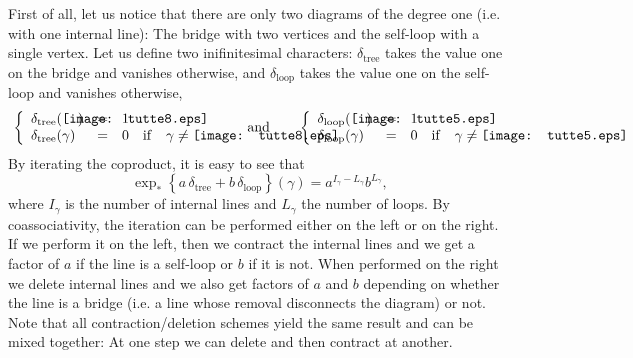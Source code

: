 \documentclass[10pt,here,feynmf]{article}
\begin{document}
First of all, let us notice that there are only two diagrams of the degree one (i.e. with one internal line): The bridge  with two vertices and the self-loop with a single vertex. Let us define two inifinitesimal characters: $\delta_{\mathrm{tree}}$ takes the value one on the bridge and vanishes otherwise, and $\delta_{\mathrm{loop}}$ takes the value one on the self-loop and vanishes otherwise,
\begin{equation}
\left\{
\begin{array}{lclcc}
\delta_{\mathrm{tree}}(\parbox{0.4cm}{\mbox{\texttt{[image: tutte8.eps]}}})&=&1&&\cr
\delta_{\mathrm{tree}}(\gamma)&=&0&\mathrm{if}&\gamma\neq\parbox{0.4cm}{\mbox{\texttt{[image: tutte8.eps]}}}
\end{array}
\right.
\qquad\mathrm{and}\qquad
\left\{
\begin{array}{lclcc}
\delta_{\mathrm{loop}}(\parbox{0.4cm}{\mbox{\texttt{[image: tutte5.eps]}}})&=&1&&\cr
\delta_{\mathrm{loop}}(\gamma)&=&0&\mathrm{if}&\gamma\neq\parbox{0.4cm}{\mbox{\texttt{[image: tutte5.eps]}}}
\end{array}
\right.
\end{equation}
By iterating the coproduct, it is easy to see that
\begin{equation}
\exp_{\ast}\left\{a\,\delta_{\mathrm{tree}}+b\,\delta_{\mathrm{loop}}\right\}(\gamma)=a^{I_{\gamma}\!-\!L_{\gamma}}b^{L_{\gamma}},
\label{diagexpo}
\end{equation}
where $I_{\gamma}$ is the number of internal lines and $L_{\gamma}$ the number of loops. By coassociativity, the iteration can be performed either on the left or on the right. If we perform it on the left, then we contract the internal lines and we get a factor of $a$ if the line is a self-loop or $b$ if it is not. When performed  on the right we delete internal lines and we also get factors of $a$ and $b$ depending on whether the line is a bridge (i.e. a line whose removal disconnects the diagram) or not. Note that all contraction/deletion schemes yield the same result and can be mixed together: At one step we can delete and then contract at another. 
\end{document}
